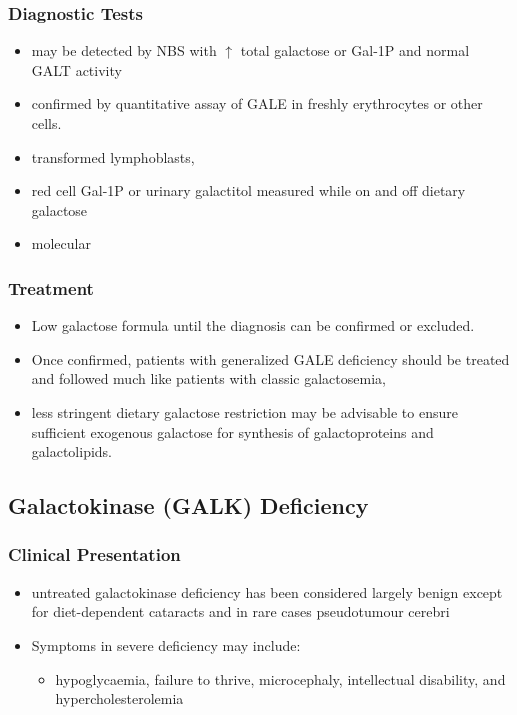 \documentclass{scrartcl}
\begin{document}
\subsubsection{Diagnostic Tests}
\label{sec:org4697f43}
\begin{itemize}
\item may be detected by NBS with \(\uparrow\) total galactose or Gal-1P and normal GALT activity
\item confirmed by quantitative assay of GALE in freshly erythrocytes or other cells.
\item transformed lymphoblasts,
\item red cell Gal-1P or urinary galactitol measured while on and off dietary galactose
\item molecular
\end{itemize}

\subsubsection{Treatment}
\label{sec:org73819b5}
\begin{itemize}
\item Low galactose formula until the diagnosis can be confirmed or excluded.
\item Once confirmed, patients with generalized GALE deficiency should be
treated and followed much like patients with classic galactosemia,
\item less stringent dietary galactose restriction may be advisable to
ensure sufficient exogenous galactose for synthesis of galactoproteins and galactolipids.
\end{itemize}
\subsection{Galactokinase (GALK) Deficiency}
\label{sec:org3ef5dd8}
\subsubsection{Clinical Presentation}
\label{sec:org61da026}
\begin{itemize}
\item untreated galactokinase deficiency has been considered largely
benign except for diet-dependent cataracts and in rare cases pseudotumour cerebri
\item Symptoms in severe deficiency may include:
\begin{itemize}
\item hypoglycaemia, failure to thrive, microcephaly, intellectual
disability, and hypercholesterolemia
\end{itemize}
\end{itemize}
\end{document}
